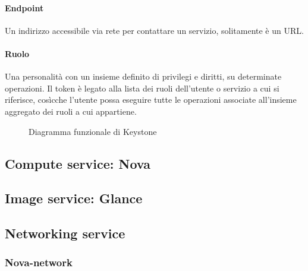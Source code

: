 \paragraph{Endpoint}
Un indirizzo accessibile via rete per contattare un servizio, solitamente è un URL.
\paragraph{Ruolo}
Una personalità con un insieme definito di privilegi e diritti, su determinate operazioni.
Il token è legato alla lista dei ruoli dell'utente o servizio a cui si riferisce, cosìcche l'utente possa eseguire tutte le operazioni associate all'insieme aggregato dei ruoli a cui appartiene.

\begin{figure}[H]
\centering
{}
\caption{Diagramma funzionale di Keystone\cite{openstackkeystone}}\label{openstackkeystone}
\end{figure}

\subsection{Compute service: Nova}
\subsection{Image service: Glance}
\subsection{Networking service}
\subsubsection{Nova-network}
